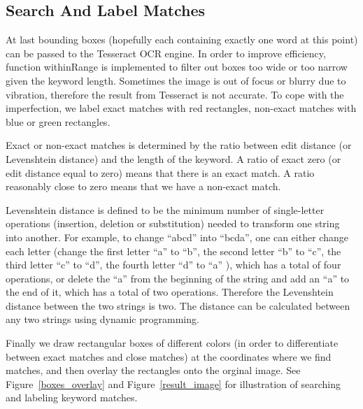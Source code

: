 \documentclass[conference]{IEEEtran}
\begin{document}
\subsection{Search And Label Matches}
At last bounding boxes (hopefully each containing exactly one word at this point) can be passed to the Tesseract OCR engine.  In order to improve efficiency, function withinRange is implemented to filter out boxes too wide or too narrow given the keyword length.  Sometimes the image is out of focus or blurry due to vibration, therefore the result from Tesseract is not accurate.  To cope with the imperfection, we label exact matches with red rectangles, non-exact matches with blue or green rectangles.

Exact or non-exact matches is determined by the ratio between edit distance (or Levenshtein distance) and the length of the keyword.  A ratio of exact zero (or edit distance equal to zero) means that there is an exact match.  A ratio reasonably close to zero means that we have a non-exact match.

Levenshtein distance is defined to be the minimum number of single-letter operations (insertion, deletion or substitution) needed to transform one string into another.  For example, to change ``abcd'' into ``bcda'', one can either change each letter (change the first letter ``a'' to ``b'', the second letter ``b'' to ``c'', the third letter ``c'' to ``d'', the fourth letter ``d'' to ``a'' ), which has a total of four operations, or delete the ``a'' from the beginning of the string and add an ``a'' to the end of it, which has a total of two operations.  Therefore the Levenshtein distance between the two strings is two.  The distance can be calculated between any two strings using dynamic programming.

Finally we draw rectangular boxes of different colors (in order to differentiate between exact matches and close matches) at the coordinates where we find matches, and then overlay the rectangles onto the orginal image.  See Figure~\ref{boxes_overlay} and Figure~\ref{result_image} for illustration of searching and labeling keyword matches.
\end{document}
